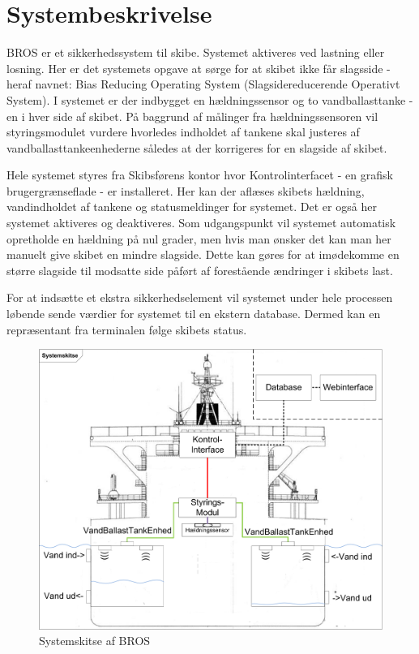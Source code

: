 \chapter{Systembeskrivelse}
BROS er et sikkerhedssystem til skibe. Systemet aktiveres ved lastning eller losning. Her er det systemets opgave at sørge for at skibet ikke får slagsside - heraf navnet: Bias Reducing Operating System (Slagsidereducerende Operativt System).
I systemet er der indbygget en hældningssensor og to vandballasttanke - en i hver side af skibet. På baggrund af målinger fra hældningssensoren vil styringsmodulet vurdere hvorledes indholdet af tankene skal justeres af vandballasttankeenhederne således at der korrigeres for en slagside af skibet.

Hele systemet styres fra Skibsførens kontor hvor Kontrolinterfacet - en grafisk brugergrænseflade - er installeret. Her kan der aflæses skibets hældning, vandindholdet af tankene og statusmeldinger for systemet. Det er også her systemet aktiveres og deaktiveres.
Som udgangspunkt vil systemet automatisk opretholde en hældning på nul grader, men hvis man ønsker det kan man her manuelt give skibet en mindre slagside. Dette kan gøres for at imødekomme en større slagside til modsatte side påført af forestående ændringer i skibets last.

For at indsætte et ekstra sikkerhedselement vil systemet under hele processen løbende sende værdier for systemet til en ekstern database. Dermed kan en repræsentant fra terminalen følge skibets status.

\begin{figure}[H]
\centering
\includegraphics[width = .72\textwidth]{billeder/systemfigur}
\caption{Systemskitse af BROS}
\label{fig:systemskitse}
\end{figure}